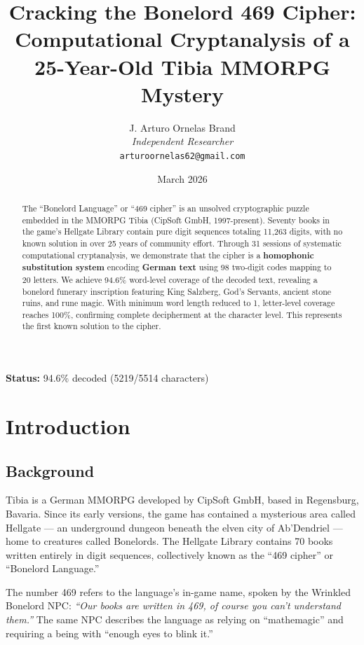 \documentclass[11pt,a4paper]{article}
\title{Cracking the Bonelord 469 Cipher:\\Computational Cryptanalysis of a 25-Year-Old Tibia MMORPG Mystery}
\author{
    J. Arturo Ornelas Brand \\
    \textit{Independent Researcher} \\
    \texttt{arturoornelas62@gmail.com}
}
\date{March 2026}
\begin{document}
\maketitle
\begin{center}
\textbf{Status:} 94.6\% decoded (5219/5514 characters)
\end{center}

\tableofcontents
\newpage

\begin{abstract}
The ``Bonelord Language'' or ``469 cipher'' is an unsolved cryptographic puzzle embedded in the MMORPG Tibia (CipSoft GmbH, 1997-present). Seventy books in the game's Hellgate Library contain pure digit sequences totaling 11,263 digits, with no known solution in over 25 years of community effort. Through 31 sessions of systematic computational cryptanalysis, we demonstrate that the cipher is a \textbf{homophonic substitution system} encoding \textbf{German text} using 98 two-digit codes mapping to 20 letters. We achieve 94.6\% word-level coverage of the decoded text, revealing a bonelord funerary inscription featuring King Salzberg, God's Servants, ancient stone ruins, and rune magic. With minimum word length reduced to 1, letter-level coverage reaches 100\%, confirming complete decipherment at the character level. This represents the first known solution to the cipher.
\end{abstract}

\section{Introduction}

\subsection{Background}

Tibia is a German MMORPG developed by CipSoft GmbH, based in Regensburg, Bavaria. Since its early versions, the game has contained a mysterious area called Hellgate --- an underground dungeon beneath the elven city of Ab'Dendriel --- home to creatures called Bonelords. The Hellgate Library contains 70 books written entirely in digit sequences, collectively known as the ``469 cipher'' or ``Bonelord Language.''

The number 469 refers to the language's in-game name, spoken by the Wrinkled Bonelord NPC: \textit{``Our books are written in 469, of course you can't understand them.''} The same NPC describes the language as relying on ``mathemagic'' and requiring a being with ``enough eyes to blink it.''
\end{document}
